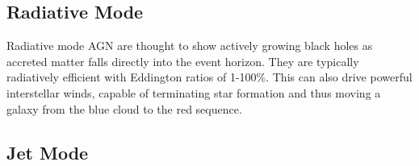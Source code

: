 	\subsection{Radiative Mode}
		\label{subsec:introRadiative}
		Radiative mode AGN are thought to show actively growing black holes as accreted matter falls directly into the event horizon. They are typically radiatively efficient with Eddington ratios of 1-100\%. This can also drive powerful interstellar winds, capable of terminating star formation and thus moving a galaxy from the blue cloud to the red sequence. 

	\subsection{Jet Mode}
		\label{subsec:introJet}
